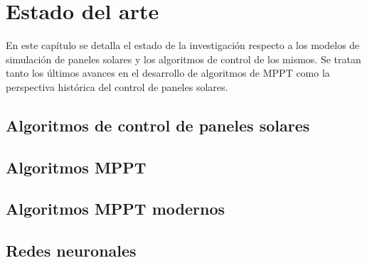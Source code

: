\chapter{Estado del arte}

En este capítulo se detalla el estado de la investigación respecto a los modelos de simulación de 
paneles solares y los algoritmos de control de los mismos. 
Se tratan tanto los últimos avances en el desarrollo de algoritmos de MPPT como
la perspectiva histórica del control de paneles solares. 




\section{Algoritmos de control de paneles solares}

\section{Algoritmos MPPT}

\section{Algoritmos MPPT modernos}

\section{Redes neuronales}